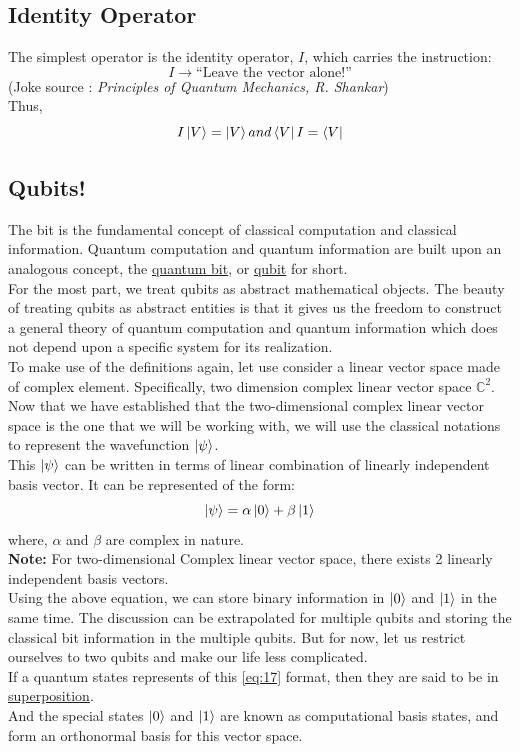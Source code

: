 \documentclass{article}
\begin{document}
\subsection{Identity Operator}
\label{subsec:Identity Operator}
The simplest operator is the identity operator, $I$, which carries the instruction:
\begin{equation*}
    I \longrightarrow \text{“Leave the vector alone!”}
\end{equation*} (Joke source : \textit{Principles of Quantum Mechanics, R. Shankar})\\
Thus,
\begin{equation}
    I\ket{V} = \ket{V} and\\
    \bra{V}I = \bra{V}
\end{equation}

\subsection{Qubits! }
\label{subsec:Qubits!}
The bit is the fundamental concept of classical computation and classical information.
Quantum computation and quantum information are built upon an analogous concept,
the \underline{quantum bit}, or \underline{qubit} for short.\\
For the most part, we treat qubits as
abstract mathematical objects. The beauty of treating qubits as abstract entities is that it gives us the freedom to construct a general theory of quantum computation and quantum information which does not depend upon a speciﬁc system for its realization.\\
To make use of the definitions again, let use consider a linear vector space made of complex element. Specifically, two dimension complex linear vector space $\mathbb{C}^{2}$.\\
Now that we have established that the two-dimensional complex linear vector space is the one that we will be working with, we will use the classical notations to represent the wavefunction $\ket{\psi}$.\\
This $\ket{\psi}$ can be written in terms of linear combination of linearly independent basis vector. It can be represented of the form:
\begin{equation}\label{eq:17}
    \ket{\psi} = \alpha\ket{0} + \beta\ket{1}  
\end{equation}
where, $\alpha$ and $\beta$ are complex in nature.\\
\textbf{Note:} For two-dimensional Complex linear vector space, there exists 2 linearly independent basis vectors.\\
Using the above equation, we can store binary information in $\ket{0}$ and $\ket{1}$ in the same time. The discussion can be extrapolated for multiple qubits and storing the classical bit information in the multiple qubits. But for now, let us restrict ourselves to two qubits and make our life less complicated.\\
If a quantum states represents of this \eqref{eq:17} format, then they are said to be in \underline{superposition}. \\
And the special states $\ket{0}$ and $\ket{1}$ are known as
computational basis states, and form an orthonormal basis for this vector space.
\end{document}
